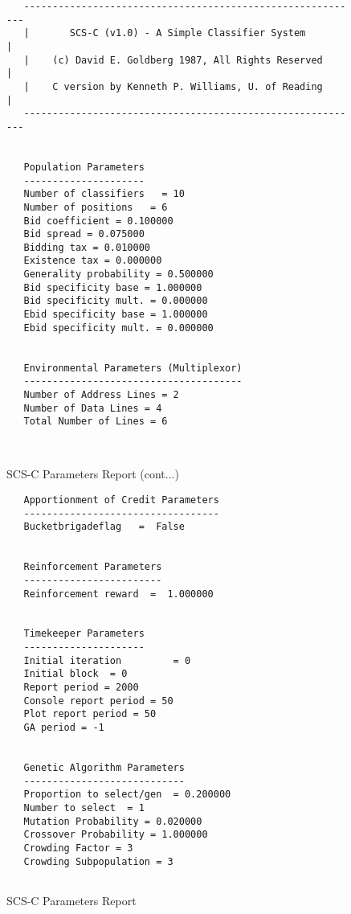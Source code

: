 \begin{figure}
\begin{center}
\begin{verbatim}
   ----------------------------------------------------------- 
   |       SCS-C (v1.0) - A Simple Classifier System         | 
   |    (c) David E. Goldberg 1987, All Rights Reserved      | 
   |    C version by Kenneth P. Williams, U. of Reading      |
   -----------------------------------------------------------

 
   Population Parameters
   ---------------------
   Number of classifiers   = 10
   Number of positions   = 6
   Bid coefficient = 0.100000
   Bid spread = 0.075000
   Bidding tax = 0.010000
   Existence tax = 0.000000
   Generality probability = 0.500000
   Bid specificity base = 1.000000
   Bid specificity mult. = 0.000000
   Ebid specificity base = 1.000000
   Ebid specificity mult. = 0.000000
 

   Environmental Parameters (Multiplexor)
   --------------------------------------
   Number of Address Lines = 2
   Number of Data Lines = 4
   Total Number of Lines = 6



\end{verbatim}
\caption{SCS-C Parameters Report (cont...)}
\label{parameters1}
\end{center}
\end{figure}

 
\begin{figure}
\begin{center}
\begin{verbatim}
   Apportionment of Credit Parameters
   ----------------------------------
   Bucketbrigadeflag   =  False

 
   Reinforcement Parameters
   ------------------------
   Reinforcement reward  =  1.000000

 
   Timekeeper Parameters
   ---------------------
   Initial iteration         = 0
   Initial block  = 0
   Report period = 2000
   Console report period = 50
   Plot report period = 50
   GA period = -1

 
   Genetic Algorithm Parameters
   ----------------------------
   Proportion to select/gen  = 0.200000
   Number to select  = 1
   Mutation Probability = 0.020000
   Crossover Probability = 1.000000
   Crowding Factor = 3
   Crowding Subpopulation = 3


\end{verbatim}
\caption{SCS-C Parameters Report}
\label{parameters2}
\end{center}
\end{figure}



